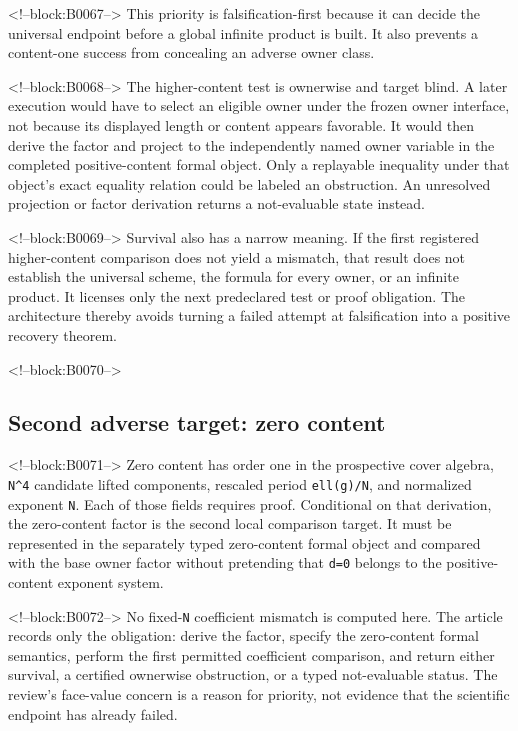 \documentclass[11pt]{article}
\begin{document}
<!--block:B0067-->
This priority is falsification-first because it can decide the universal
endpoint before a global infinite product is built. It also prevents a
content-one success from concealing an adverse owner class.

<!--block:B0068-->
The higher-content test is ownerwise and target blind. A later execution
would have to select an eligible owner under the frozen owner interface,
not because its displayed length or content appears favorable. It would
then derive the factor and project to the independently named owner
variable in the completed positive-content formal object. Only a
replayable inequality under that object's exact equality relation could
be labeled an obstruction. An unresolved projection or factor
derivation returns a not-evaluable state instead.

<!--block:B0069-->
Survival also has a narrow meaning. If the first registered
higher-content comparison does not yield a mismatch, that result does
not establish the universal scheme, the formula for every owner, or an
infinite product. It licenses only the next predeclared test or proof
obligation. The architecture thereby avoids turning a failed attempt at
falsification into a positive recovery theorem.

<!--block:B0070-->
\hypertarget{43-second-adverse-target-zero-content}{%
\subsection{Second adverse target: zero
content}\label{43-second-adverse-target-zero-content}}

<!--block:B0071-->
Zero content has order one in the prospective cover algebra,
\texttt{N\^{}4} candidate lifted components, rescaled period
\texttt{ell(g)/N}, and normalized exponent \texttt{N}. Each of those
fields requires proof. Conditional on that derivation, the zero-content
factor is the second local comparison target. It must be represented in
the separately typed zero-content formal object and compared with the
base owner factor without pretending that \texttt{d=0} belongs to the
positive-content exponent system.

<!--block:B0072-->
No fixed-\texttt{N} coefficient mismatch is computed here. The article
records only the obligation: derive the factor, specify the zero-content
formal semantics, perform the first permitted coefficient comparison,
and return either survival, a certified ownerwise obstruction, or a
typed not-evaluable status. The review's face-value concern is a reason
for priority, not evidence that the scientific endpoint has already
failed.
\end{document}
